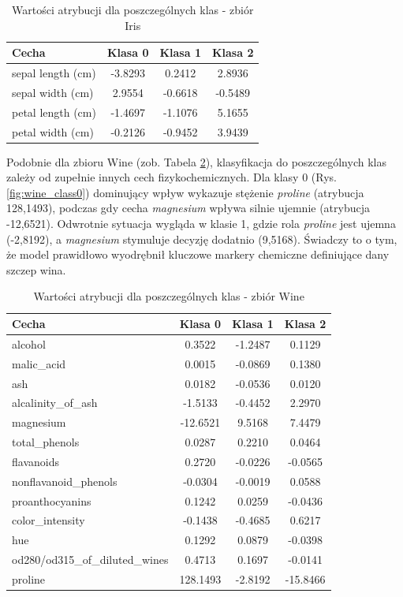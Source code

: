 \documentclass[10pt,journal,compsoc]{IEEEtran}
\begin{document}
\begin{table}[htbp]
\caption{Wartości atrybucji dla poszczególnych klas - zbiór Iris}
\label{tab:iris}
\begin{center}
\begin{tabular}{|l|c|c|c|}
\hline
\textbf{Cecha} & \textbf{Klasa 0} & \textbf{Klasa 1} & \textbf{Klasa 2} \\
\hline
sepal length (cm) & -3.8293 & 0.2412 & 2.8936 \\
sepal width (cm) & 2.9554 & -0.6618 & -0.5489 \\
petal length (cm) & -1.4697 & -1.1076 & 5.1655 \\
petal width (cm) & -0.2126 & -0.9452 & 3.9439 \\
\hline
\end{tabular}
\end{center}
\end{table}

Podobnie dla zbioru Wine (zob. Tabela \ref{tab:wine}), klasyfikacja do poszczególnych klas zależy od zupełnie innych cech fizykochemicznych. Dla klasy 0 (Rys. \ref{fig:wine_class0}) dominujący wpływ wykazuje stężenie \textit{proline} (atrybucja 128,1493), podczas gdy cecha \textit{magnesium} wpływa silnie ujemnie (atrybucja -12,6521). Odwrotnie sytuacja wygląda w klasie 1, gdzie rola \textit{proline} jest ujemna (-2,8192), a \textit{magnesium} stymuluje decyzję dodatnio (9,5168). Świadczy to o tym, że model prawidłowo wyodrębnił kluczowe markery chemiczne definiujące dany szczep wina.

\begin{table}[htbp]
\caption{Wartości atrybucji dla poszczególnych klas - zbiór Wine}
\label{tab:wine}
\begin{center}
\begin{tabular}{|l|c|c|c|}
\hline
\textbf{Cecha} & \textbf{Klasa 0} & \textbf{Klasa 1} & \textbf{Klasa 2} \\
\hline
alcohol & 0.3522 & -1.2487 & 0.1129 \\
malic\_acid & 0.0015 & -0.0869 & 0.1380 \\
ash & 0.0182 & -0.0536 & 0.0120 \\
alcalinity\_of\_ash & -1.5133 & -0.4452 & 2.2970 \\
magnesium & -12.6521 & 9.5168 & 7.4479 \\
total\_phenols & 0.0287 & 0.2210 & 0.0464 \\
flavanoids & 0.2720 & -0.0226 & -0.0565 \\
nonflavanoid\_phenols & -0.0304 & -0.0019 & 0.0588 \\
proanthocyanins & 0.1242 & 0.0259 & -0.0436 \\
color\_intensity & -0.1438 & -0.4685 & 0.6217 \\
hue & 0.1292 & 0.0879 & -0.0398 \\
od280/od315\_of\_diluted\_wines & 0.4713 & 0.1697 & -0.0141 \\
proline & 128.1493 & -2.8192 & -15.8466 \\
\hline
\end{tabular}
\end{center}
\end{table}
\end{document}

